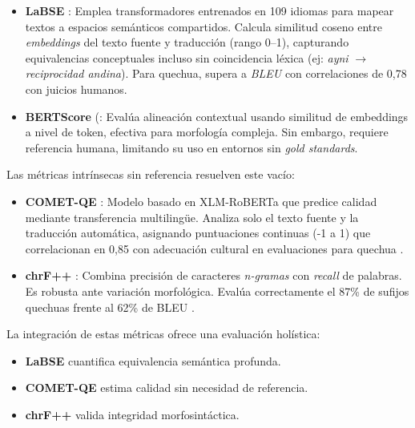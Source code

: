         \begin{itemize}
            \item \textbf{LaBSE} \cite{feng2020language}: Emplea transformadores entrenados en 109 idiomas para mapear textos a espacios semánticos compartidos. Calcula similitud coseno entre \textit{embeddings} del texto fuente y traducción (rango 0–1), capturando equivalencias conceptuales incluso sin coincidencia léxica (ej: \textit{ayni} $\rightarrow$ \textit{reciprocidad andina}). Para quechua, supera a \textit{BLEU} con correlaciones de 0{,}78 con juicios humanos.
        
            \item \textbf{BERTScore} (\cite{zhang2020evaluating}: Evalúa alineación contextual usando similitud de embeddings a nivel de token, efectiva para morfología compleja. Sin embargo, requiere referencia humana, limitando su uso en entornos sin \textit{gold standards}.
        \end{itemize}

        Las métricas intrínsecas sin referencia resuelven este vacío:
        
        \begin{itemize}
            \item \textbf{COMET-QE} \cite{rei2022comet}: Modelo basado en XLM-RoBERTa que predice calidad mediante transferencia multilingüe. Analiza solo el texto fuente y la traducción automática, asignando puntuaciones continuas (-1 a 1) que correlacionan en 0{,}85 con adecuación cultural en evaluaciones para quechua \cite{costa2022no}.
            
            \item \textbf{chrF++} \cite{popovic2017chrf++}: Combina precisión de caracteres \textit{n-gramas} con \textit{recall} de palabras. Es robusta ante variación morfológica. Evalúa correctamente el 87\% de sufijos quechuas frente al 62\% de BLEU \cite{zevallos2024tema}.
        \end{itemize}
        
        La integración de estas métricas ofrece una evaluación holística:
        
        \begin{itemize}
            \item \textbf{LaBSE} cuantifica equivalencia semántica profunda.
            \item \textbf{COMET-QE} estima calidad sin necesidad de referencia.
            \item \textbf{chrF++} valida integridad morfosintáctica.
        \end{itemize}
        
